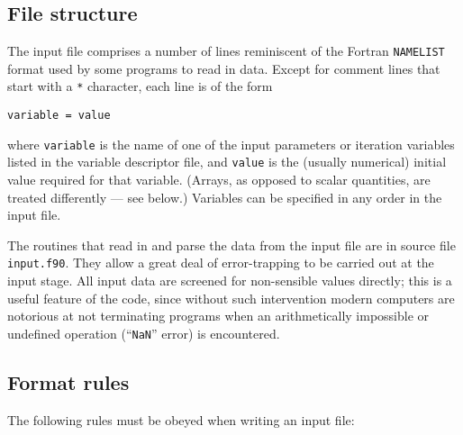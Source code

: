 \documentclass[11pt,a4paper]{report}
\begin{document}
\subsection{File structure}

The input file comprises a number of lines reminiscent of the Fortran
\texttt{NAMELIST} format used by some programs to read in data. Except for
comment lines that start with a \texttt{*} character, each line is of the form
\begin{verbatim}
variable = value
\end{verbatim}
where \texttt{variable} is the name of one of the input parameters or
iteration variables listed in the variable descriptor file, and \texttt{value}
is the (usually numerical) initial value required for that variable. (Arrays,
as opposed to scalar quantities, are treated differently --- see below.)
Variables can be specified in any order in the input file.

The routines that read in and parse the data from the input file are in source
file \texttt{input.f90}. They allow a great deal of error-trapping to be
carried out at the input stage.  All input data are screened for non-sensible
values directly; this is a useful feature of the code, since without such
intervention modern computers are notorious at not terminating programs when
an arithmetically impossible or undefined operation (``\texttt{NaN}'' error)
is encountered.

\subsection{Format rules}

The following rules must be obeyed when writing an input file:
\end{document}
